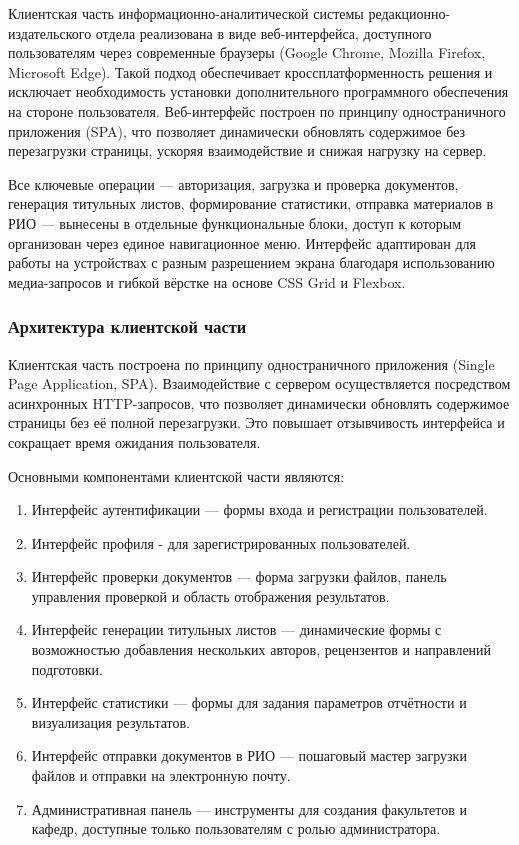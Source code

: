 Клиентская часть информационно-аналитической системы редакционно-издательского отдела реализована в виде веб-интерфейса, доступного пользователям через современные браузеры (Google Chrome, Mozilla Firefox, Microsoft Edge). Такой подход обеспечивает кроссплатформенность решения и исключает необходимость установки дополнительного программного обеспечения на стороне пользователя. Веб-интерфейс построен по принципу одностраничного приложения (SPA), что позволяет динамически обновлять содержимое без перезагрузки страницы, ускоряя взаимодействие и снижая нагрузку на сервер. 


Все ключевые операции — авторизация, загрузка и проверка документов, генерация титульных листов, формирование статистики, отправка материалов в РИО — вынесены в отдельные функциональные блоки, доступ к которым организован через единое навигационное меню. Интерфейс адаптирован для работы на устройствах с разным разрешением экрана благодаря использованию медиа-запросов и гибкой вёрстке на основе CSS Grid и Flexbox.

\subsubsection{Архитектура клиентской части}

Клиентская часть построена по принципу одностраничного приложения (Single Page Application, SPA). Взаимодействие с сервером осуществляется посредством асинхронных HTTP-запросов, что позволяет динамически обновлять содержимое страницы без её полной перезагрузки. Это повышает отзывчивость интерфейса и сокращает время ожидания пользователя.

Основными компонентами клиентской части являются:

\begin{enumerate}
	\item Интерфейс аутентификации — формы входа и регистрации пользователей.
	\item Интерфейс профиля - для зарегистрированных пользователей. 
	\item Интерфейс проверки документов — форма загрузки файлов, панель управления проверкой и область отображения результатов.
	\item Интерфейс генерации титульных листов — динамические формы с возможностью добавления нескольких авторов, рецензентов и направлений подготовки.
	\item Интерфейс статистики — формы для задания параметров отчётности и визуализация результатов.
	\item Интерфейс отправки документов в РИО — пошаговый мастер загрузки файлов и отправки на электронную почту.
	\item Административная панель — инструменты для создания факультетов и кафедр, доступные только пользователям с ролью администратора.
\end{enumerate}


